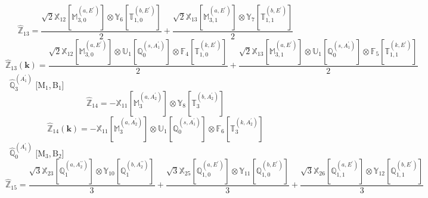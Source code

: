 \documentclass[fleqn,10pt,landscape]{article}
\begin{document}
\begin{itemize}
\begin{dmath*}
\hat{\mathbb{Z}}_{13}=\frac{\sqrt{2} \mathbb{X}_{12}[\mathbb{M}_{3,0}^{(a,E^{\prime})}] \otimes\mathbb{Y}_{6}[\mathbb{T}_{1,0}^{(b,E^{\prime})}]}{2} + \frac{\sqrt{2} \mathbb{X}_{13}[\mathbb{M}_{3,1}^{(a,E^{\prime})}] \otimes\mathbb{Y}_{7}[\mathbb{T}_{1,1}^{(b,E^{\prime})}]}{2}
\end{dmath*}
\begin{dmath*}
\hat{\mathbb{Z}}_{13}(\bm{k})=\frac{\sqrt{2} \mathbb{X}_{12}[\mathbb{M}_{3,0}^{(a,E^{\prime})}] \otimes\mathbb{U}_{1}[\mathbb{Q}_{0}^{(s,A_{1}^{\prime})}] \otimes\mathbb{F}_{4}[\mathbb{T}_{1,0}^{(k,E^{\prime})}]}{2} + \frac{\sqrt{2} \mathbb{X}_{13}[\mathbb{M}_{3,1}^{(a,E^{\prime})}] \otimes\mathbb{U}_{1}[\mathbb{Q}_{0}^{(s,A_{1}^{\prime})}] \otimes\mathbb{F}_{5}[\mathbb{T}_{1,1}^{(k,E^{\prime})}]}{2}
\end{dmath*}
\vspace{4mm}
\noindent {} $\,\,\,\hat{\mathbb{Q}}_{3}^{(A_{1}^{\prime})}$ [M$_{1}$,\,B$_{1}$]
\begin{dmath*}
\hat{\mathbb{Z}}_{14}=- \mathbb{X}_{11}[\mathbb{M}_{3}^{(a,A_{2}^{\prime})}] \otimes\mathbb{Y}_{8}[\mathbb{T}_{3}^{(b,A_{2}^{\prime})}]
\end{dmath*}
\begin{dmath*}
\hat{\mathbb{Z}}_{14}(\bm{k})=- \mathbb{X}_{11}[\mathbb{M}_{3}^{(a,A_{2}^{\prime})}] \otimes\mathbb{U}_{1}[\mathbb{Q}_{0}^{(s,A_{1}^{\prime})}] \otimes\mathbb{F}_{6}[\mathbb{T}_{3}^{(k,A_{2}^{\prime})}]
\end{dmath*}
\vspace{4mm}
\noindent {} $\,\,\,\hat{\mathbb{Q}}_{0}^{(A_{1}^{\prime})}$ [M$_{3}$,\,B$_{2}$]
\begin{dmath*}
\hat{\mathbb{Z}}_{15}=\frac{\sqrt{3} \mathbb{X}_{23}[\mathbb{Q}_{1}^{(a,A_{2}^{\prime\prime})}] \otimes\mathbb{Y}_{10}[\mathbb{Q}_{1}^{(b,A_{2}^{\prime\prime})}]}{3} + \frac{\sqrt{3} \mathbb{X}_{25}[\mathbb{Q}_{1,0}^{(a,E^{\prime})}] \otimes\mathbb{Y}_{11}[\mathbb{Q}_{1,0}^{(b,E^{\prime})}]}{3} + \frac{\sqrt{3} \mathbb{X}_{26}[\mathbb{Q}_{1,1}^{(a,E^{\prime})}] \otimes\mathbb{Y}_{12}[\mathbb{Q}_{1,1}^{(b,E^{\prime})}]}{3}
\end{dmath*}
\begin{dmath*}

\end{dmath*}
\end{itemize}
\end{document}
